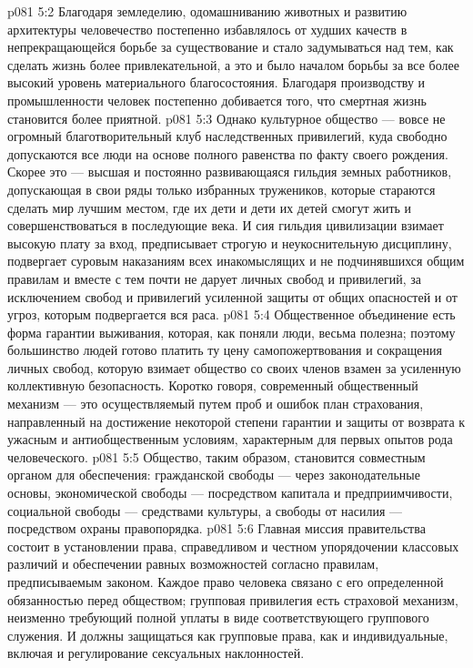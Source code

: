 \vs p081 5:2 Благодаря земледелию, одомашниванию животных и развитию архитектуры человечество постепенно избавлялось от худших качеств в непрекращающейся борьбе за существование и стало задумываться над тем, как сделать жизнь более привлекательной, а это и было началом борьбы за все более высокий уровень материального благосостояния. Благодаря производству и промышленности человек постепенно добивается того, что смертная жизнь становится более приятной.
\vs p081 5:3 Однако культурное общество --- вовсе не огромный благотворительный клуб наследственных привилегий, куда свободно допускаются все люди на основе полного равенства по факту своего рождения. Скорее это --- высшая и постоянно развивающаяся гильдия земных работников, допускающая в свои ряды только избранных тружеников, которые стараются сделать мир лучшим местом, где их дети и дети их детей смогут жить и совершенствоваться в последующие века. И сия гильдия цивилизации взимает высокую плату за вход, предписывает строгую и неукоснительную дисциплину, подвергает суровым наказаниям всех инакомыслящих и не подчинявшихся общим правилам и вместе с тем почти не дарует личных свобод и привилегий, за исключением свобод и привилегий усиленной защиты от общих опасностей и от угроз, которым подвергается вся раса.
\vs p081 5:4 Общественное объединение есть форма гарантии выживания, которая, как поняли люди, весьма полезна; поэтому большинство людей готово платить ту цену самопожертвования и сокращения личных свобод, которую взимает общество со своих членов взамен за усиленную коллективную безопасность. Коротко говоря, современный общественный механизм --- это осуществляемый путем проб и ошибок план страхования, направленный на достижение некоторой степени гарантии и защиты от возврата к ужасным и антиобщественным условиям, характерным для первых опытов рода человеческого.
\vs p081 5:5 Общество, таким образом, становится совместным органом для обеспечения: гражданской свободы --- через законодательные основы, экономической свободы --- посредством капитала и предприимчивости, социальной свободы --- средствами культуры, а свободы от насилия --- посредством охраны правопорядка.
\vs p081 5:6  Главная миссия правительства состоит в установлении права, справедливом и честном упорядочении классовых различий и обеспечении равных возможностей согласно правилам, предписываемым законом. Каждое право человека связано с его определенной обязанностью перед обществом; групповая привилегия есть страховой механизм, неизменно требующий полной уплаты в виде соответствующего группового служения. И должны защищаться как групповые права, как и индивидуальные, включая и регулирование сексуальных наклонностей.
